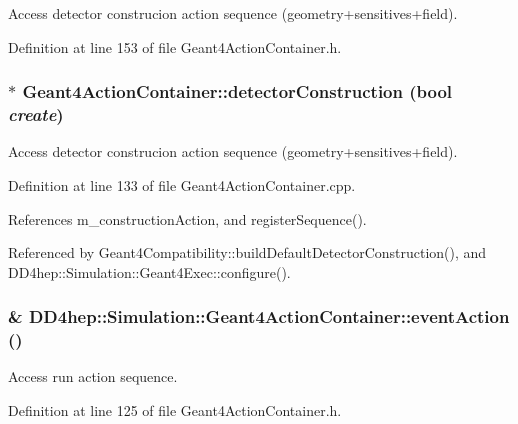 Access detector construcion action sequence (geometry+sensitives+field). 

Definition at line 153 of file Geant4ActionContainer.h.\hypertarget{class_d_d4hep_1_1_simulation_1_1_geant4_action_container_a4dba304abe94e83eaef9c22aa196454b}{
\subsubsection[{detectorConstruction}]{ $\ast$ Geant4ActionContainer::detectorConstruction (bool {\em create})}}
\label{class_d_d4hep_1_1_simulation_1_1_geant4_action_container_a4dba304abe94e83eaef9c22aa196454b}


Access detector construcion action sequence (geometry+sensitives+field). 

Definition at line 133 of file Geant4ActionContainer.cpp.

References m\_\-constructionAction, and registerSequence().

Referenced by Geant4Compatibility::buildDefaultDetectorConstruction(), and DD4hep::Simulation::Geant4Exec::configure().\hypertarget{class_d_d4hep_1_1_simulation_1_1_geant4_action_container_a50aa73045e0959041a1ae5c162ab840d}{
\subsubsection[{eventAction}]{\& DD4hep::Simulation::Geant4ActionContainer::eventAction ()}}
\label{class_d_d4hep_1_1_simulation_1_1_geant4_action_container_a50aa73045e0959041a1ae5c162ab840d}


Access run action sequence. 

Definition at line 125 of file Geant4ActionContainer.h.

